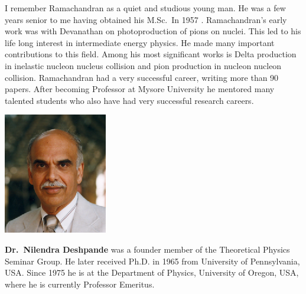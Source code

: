 I remember Ramachandran as a quiet and studious young man. He was a few years senior to me having obtained his M.Sc.\ In 1957 . Ramachandran’s early work was with Devanathan on photoproduction of pions on nuclei. This led to his life long interest in intermediate energy physics. He made many important contributions to this field. Among his most significant works is Delta production in inelastic nucleon nucleus collision and pion production in nucleon  nucleon  collision.  Ramachandran had a very successful career, writing more than 90 papers. After becoming Professor at Mysore University he mentored many talented students who also have had very successful  research careers.

\vspace{.7cm}

\centerline{\includegraphics[scale=1.6]{authorsphotos/N_G_Deshpande.eps}}  
\bigskip

\noindent
\textbf{Dr.\ Nilendra Deshpande} was a founder member of the Theoretical Physics Seminar Group. He later received Ph.D. in 1965 from University of Pennsylvania, USA. Since 1975 he is at the Department of Physics, University of Oregon, USA, where he is currently Professor Emeritus.
